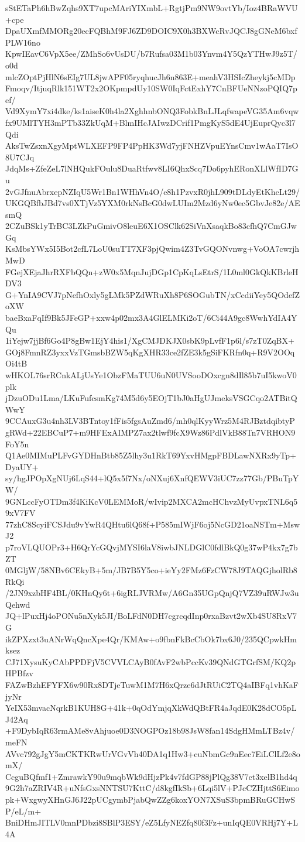 sStETaPh6hBwZqhs9XT7upcMAriYIXmbL+RgtjPm9NW9ovtYb/Ioz4BRaWVU+cpe
DpaUXmfMMORg20ecFQBhM9FJ6ZD9DOIC9X0h3BXWcRvJQCJ8gGNeM6bxfPLW16no
KpwIEavC6VpX5ee/ZMhSo6vUsDU/b7Rufsa03M1b03Ynvm4Y5QzYTHwJ9z5T/o0d
mlcZOptPjHlN6sEIg7UL8jwAPF05ryqhucJh6n863E+meahV3HSIcZheykj5cMDp
Fmoqv/ItjuqRlk151WT2x2OKpmpdUy10SW0IqFctExhY7CnBFUeNNzoPQIQ7pef/
Vd9XymY7xi4dke/ks1aiseK0h4la2XghhnbONQ3FobkBnLJLqfwapeVG35Am6vqw
fx9UMlTYH3mPTb33ZkUqM+BlmIHcJAIwzDCrif1PmgKyS5dE4UjEuprQyc3l7Qdi
AksTwZsxnXgyMptWLXEFP9FP4PpHK3Wd7yjFNHZVpuEYnsCmv1wAaT7IsO8U7CJq
JdqMs+ZfeZeL7lNHQukFOulu8DuaRtfwv8LI6QhxScq7Do6pyhERonXLlWfID7Gu
2vGJfnuAbrxepNZIqU5Wr1Bn1WHhVn4O/e8h1PzvxR0jhL909tDLdyEtKhcLt29/
UKGQBfbJBd7vs0XTjVz5YXM0rkNsBcG0dwLUIm2Mzd6yNw0ec5GbvJe82e/AEsmQ
2CZuBSk1yTrBC3LZkPuGmivO8leuE6X1OSClk62SiVnXsaqkBo83cfhQ7CmGJwGq
KsMbsYWx5I5Bot2cfL7LoU0suTT7XF3pjQwim4Z3TvGQONvnwg+VoOA7cwrjhMwD
FGejXEjaJhrRXFbQQn+zW0x5MqnJujDGp1CpKqLsEtrS/1L0ml0GkQkKBrleHDV3
G+YnIA9CVJ7pNefhOxly5gLMk5PZdWRuXh8P6SOGubTN/xCcdiiYey5QOdefZoXW
baeBxaFqIf9Bk5JFeGP+xxw4p02mx3A4GlELMKi2oT/6Ci44A9gc8WwhYdIA4YQu
1iYejw7jjBf6Go4P8gBw1EjY4his1/XgCMJDKJX0sbK9pLvfF1p6l/s7zT0ZqBX+
GOj8FmnRZ3yxxVzTGmsbBZW5qKgXHR33ce2fZE3k5gSiFKRfn0q+R9V2OOqOi4tB
wHKOL76srRCnkALjUsYe1ObzFMaTUU6uN0UVSooDOxcgn8dIl85b7uI5kwoV0plk
jDzuODu1Lma/LKuFufcsmKg74M5d6y5EOjT1bJ0aHgUJmeksVSGCqo2ATBitQWwY
9CCAuxG3u4nh3LV3BTntoy1fFis5fgsAuZmd6/mh0qlKyyWrz5M4RJBztdqibtyP
gRWd+22EBCuP7+m9HFExAIMPZ7ax2tlwf9fcX9Wz86PdlVkB88Tn7VRHON9FoY5n
Q1Ae0MIMuPLFvGYDHnBtb85Z5lhy3u1RkT69YxvHMgpFBDLawNXRx9yTp+DyaUY+
sy/hgJPOpXgNUj6LqS44+lQ5x5f7Nx/oNXuj6XnfQEWV3iUC7zz77Gb/PBuTpYW/
9GNLccFyOTDm3f4KiKcV0LEMMoR/wIvip2MXCA2mcHChvzMyUvpxTNL6q59xV7FV
77zhC8ScyiFCSJdu9vYwR4QHtu6lQ68f+P585mIWjF6oj5NcGD21oaNSTm+MswJ2
p7roVLQUOPr3+H6QrYcGQvjMYSI6laV8iwbJNLDGlC0fdlBkQ0g37wP4kx7g7bZT
0MGljW/58NBv6CEkyB+5m/JB7B5Y5co+ieYy2FMz6FzCW78J9TAQGjholRb8RkQi
/2JN9xzbHF4BL/0KHnQy6t+6igRLJVRMw/A6Gn35UGpQnjQ7VZ39uRWJw3uQehwd
JQ+lPuxHj4oPONu5nXyk5JI/BoLFdN0DH7cgrcqdInp0rxaBzvt2wXb4SU8RxV7G
ikZPXzxt3uANrWqQncXpe4Qr/KMAw+o9fbnFkBcCbOk7bx6J0/235QCpwkHmksez
CJ71XysuKyCAbPPDFjV5CVVLCAyB0fAvF2wbPccKv39QNdGTGrfSM/KQ2pHPBfzv
FAZwBzhEFYFX6w90Rx8DTjeTuwM1M7H6xQrze6dJtRUiC2TQ4aIBFq1vhKaFjyNr
YeIX53mvacNqrkB1KUH8G+41k+0qOdYmjqXkWdQBtFR4aJqdE0K28dCO5pLJ42Aq
+F9DybIqR63rmAMe8vAhjuoe0D3NOGPOz18b98JsW8fan14SdgHMmLTBz4v/meFN
AVvc792gJgY5mCKTKRwUrVGvVh40DA1q1Hw3+cuNbmGc9nEec7EiLClLf2e8omX/
CcguBQfmf1+ZmrawkY90u9mqbWk9dHjzPk4v7fdGP88jPlQg38V7ct3xelB1hd4q
9G2h7aZRIV4R+uNfsGxsNNTSU7KttC/d8kgfIkSb+6Lqi5lV+PJcCZHjttS6Eimo
pk+WxgwyXHnGJ6J22pUCgymbPjabQwZZg6koxYON7XSuS3bpmBRuGCHwSP/eL/m+
BniDHmJITLV0mnPDbzi8SBlP3ESY/eZ5LfyNEZfq80f3Fz+unIqQE0VRHj7Y+L4A
